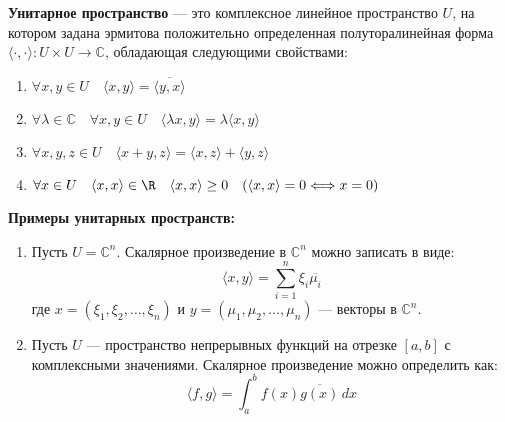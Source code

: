 \documentclass[12px]{report}
\begin{document}
\vspace{1cm}

\begin{shdef}
    \begin{definition}
        \leavevmode \newline
        
        \textbf{Унитарное пространство} — это комплексное линейное пространство $U$, на котором задана эрмитова положительно определенная полуторалинейная форма $\langle \cdot, \cdot \rangle: U \times U \to \mathbb{C}$, обладающая следующими свойствами:
    \begin{enumerate}
        \item $\forall x, y \in U \quad \langle x, y \rangle = \overline{\langle y, x \rangle}$
        \item $\forall \lambda \in \mathbb{C} \quad \forall x, y \in U \quad \langle \lambda x, y \rangle = \lambda \langle x, y \rangle$
        \item $\forall x, y, z \in U \quad \langle x + y, z \rangle = \langle x, z \rangle + \langle y, z \rangle$
        \item $\forall x \in U \quad \langle x,x \rangle \in \R \quad \langle x, x \rangle \geq 0 \quad (\langle x, x \rangle = 0 \Longleftrightarrow x = 0)$
    \end{enumerate}
    \vspace{0.3cm}
    \end{definition}
\end{shdef}


\vspace{1.0cm}
\textbf{Примеры унитарных пространств:}
\begin{shex}
    \begin{enumerate}
        \item Пусть \( U = \mathbb{C}^n \).
    Скалярное произведение в \(\mathbb{C}^n\) можно записать в виде:
    \[
    \langle x, y \rangle = \sum_{i=1}^n \xi_i \overline{\mu_i}
    \]
    где \( x = (\xi_1, \xi_2, \ldots, \xi_n) \) и \( y = (\mu_1, \mu_2, \ldots, \mu_n) \) — векторы в \(\mathbb{C}^n\).

\vspace{0.2cm}
        \item Пусть \( U \) — пространство непрерывных функций на отрезке \([a, b]\) с комплексными значениями.
    Скалярное произведение можно определить как:
    \[
    \langle f, g \rangle = \int_a^b f(x) \overline{g(x)} \, dx
    \]
    \end{enumerate}
\end{shex}
\end{document}
